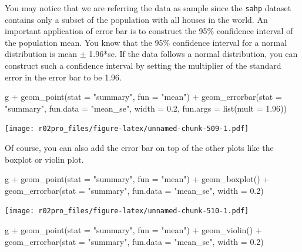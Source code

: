 \documentclass[
]{book}
\newenvironment{Shaded}{\begin{snugshade}}{\end{snugshade}}
\newcommand{\AttributeTok}[1]{\textcolor[rgb]{0.77,0.63,0.00}{#1}}
\newcommand{\FloatTok}[1]{\textcolor[rgb]{0.00,0.00,0.81}{#1}}
\newcommand{\FunctionTok}[1]{\textcolor[rgb]{0.00,0.00,0.00}{#1}}
\newcommand{\NormalTok}[1]{#1}
\newcommand{\SpecialCharTok}[1]{\textcolor[rgb]{0.00,0.00,0.00}{#1}}
\newcommand{\StringTok}[1]{\textcolor[rgb]{0.31,0.60,0.02}{#1}}
\begin{document}
You may notice that we are referring the data as sample since the \texttt{sahp} dataset contains only a subset of the population with all houses in the world. An important application of error bar is to construct the 95\% confidence interval of the population mean. You know that the 95\% confidence interval for a normal distribution is mean \(\pm\) 1.96*se. If the data follows a normal distribution, you can construct such a confidence interval by setting the multiplier of the standard error in the error bar to be 1.96.

\begin{Shaded}
\begin{Highlighting}[]
\NormalTok{g  }\SpecialCharTok{+} \FunctionTok{geom\_point}\NormalTok{(}\AttributeTok{stat =} \StringTok{"summary"}\NormalTok{, }\AttributeTok{fun =} \StringTok{"mean"}\NormalTok{) }\SpecialCharTok{+} 
  \FunctionTok{geom\_errorbar}\NormalTok{(}\AttributeTok{stat =} \StringTok{"summary"}\NormalTok{, }\AttributeTok{fun.data =} \StringTok{"mean\_se"}\NormalTok{, }\AttributeTok{width =} \FloatTok{0.2}\NormalTok{, }\AttributeTok{fun.args =} \FunctionTok{list}\NormalTok{(}\AttributeTok{mult =} \FloatTok{1.96}\NormalTok{))}
\end{Highlighting}
\end{Shaded}

\texttt{[image: r02pro\_files/figure-latex/unnamed-chunk-509-1.pdf]}

Of course, you can also add the error bar on top of the other plots like the boxplot or violin plot.

\begin{Shaded}
\begin{Highlighting}[]
\NormalTok{g  }\SpecialCharTok{+} \FunctionTok{geom\_point}\NormalTok{(}\AttributeTok{stat =} \StringTok{"summary"}\NormalTok{, }\AttributeTok{fun =} \StringTok{"mean"}\NormalTok{) }\SpecialCharTok{+} 
  \FunctionTok{geom\_boxplot}\NormalTok{() }\SpecialCharTok{+}
  \FunctionTok{geom\_errorbar}\NormalTok{(}\AttributeTok{stat =} \StringTok{"summary"}\NormalTok{, }\AttributeTok{fun.data =} \StringTok{"mean\_se"}\NormalTok{, }\AttributeTok{width =} \FloatTok{0.2}\NormalTok{)}
\end{Highlighting}
\end{Shaded}

\texttt{[image: r02pro\_files/figure-latex/unnamed-chunk-510-1.pdf]}

\begin{Shaded}
\begin{Highlighting}[]
\NormalTok{g  }\SpecialCharTok{+} \FunctionTok{geom\_point}\NormalTok{(}\AttributeTok{stat =} \StringTok{"summary"}\NormalTok{, }\AttributeTok{fun =} \StringTok{"mean"}\NormalTok{) }\SpecialCharTok{+} 
  \FunctionTok{geom\_violin}\NormalTok{() }\SpecialCharTok{+} 
  \FunctionTok{geom\_errorbar}\NormalTok{(}\AttributeTok{stat =} \StringTok{"summary"}\NormalTok{, }\AttributeTok{fun.data =} \StringTok{"mean\_se"}\NormalTok{, }\AttributeTok{width =} \FloatTok{0.2}\NormalTok{)}
\end{Highlighting}
\end{Shaded}
\end{document}

